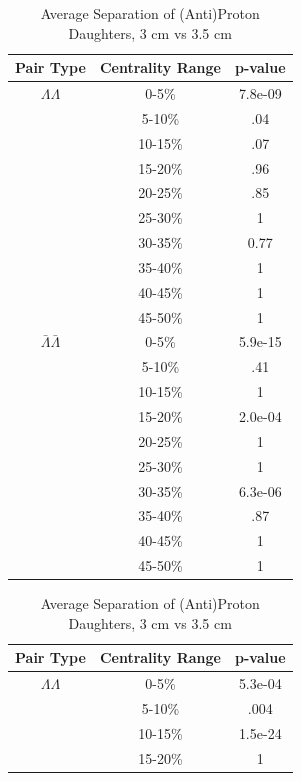 \begin{table}
\begin{minipage}{18pc}
\caption{Average Separation of (Anti)Proton Daughters, 3 cm vs 2.5 cm} \label{tab:AvgSepProtDaughters3cmVs25cm}
\begin{center}
\begin{tabular}{| c | c | c |}
  \hline                       
  Pair Type & Centrality Range & p-value \\
  \hline
  $\Lambda\Lambda$ & 0-5\% & 7.8e-09 \\
   & 5-10\%  & .04 \\
   & 10-15\% & .07 \\
   & 15-20\% & .96 \\
   & 20-25\% & .85 \\
   & 25-30\% & 1 \\
   & 30-35\% & 0.77 \\
   & 35-40\% & 1 \\
   & 40-45\% & 1 \\
   & 45-50\% & 1 \\
   \hline
  $\bar{\Lambda}\bar{\Lambda}$ &  0-5\% & 5.9e-15 \\
   & 5-10\% & .41 \\
   & 10-15\% & 1 \\
   & 15-20\% & 2.0e-04 \\
   & 20-25\% & 1 \\
   & 25-30\% & 1 \\
   & 30-35\% & 6.3e-06 \\
   & 35-40\% & .87 \\
   & 40-45\% & 1 \\
   & 45-50\% & 1 \\
  \hline  
\end{tabular}
\end{center}
\end{minipage}
\begin{minipage}{18pc}
\caption{Average Separation of (Anti)Proton Daughters, 3 cm vs 3.5 cm} \label{tab:AvgSepProtDaughters3cmVs35cm}
\begin{center}
\begin{tabular}{| c | c | c |}
  \hline                       
  Pair Type & Centrality Range & p-value \\
  \hline
  $\Lambda\Lambda$ & 0-5\% & 5.3e-04 \\
   & 5-10\%  & .004 \\
   & 10-15\% & 1.5e-24 \\
   & 15-20\% & 1 \\

\end{tabular}
\end{center}
\end{minipage}
\end{table}
